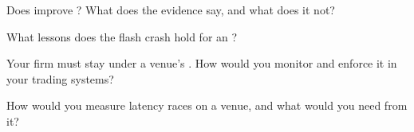 \begin{interviewq}\label{iq:mx:market-quality-and-regulation:3}
Does  improve ? What does the evidence say, and what does it not?
\end{interviewq}

\begin{interviewq}\label{iq:mx:market-quality-and-regulation:4}
What lessons does the flash crash hold for an ?
\end{interviewq}

\begin{interviewq}\label{iq:mx:market-quality-and-regulation:5}
Your firm must stay under a venue's . How would you monitor and enforce it in your trading systems?
\end{interviewq}

\begin{interviewq}\label{iq:mx:market-quality-and-regulation:6}
How would you measure latency races on a venue, and what would you need from it?
\end{interviewq}
